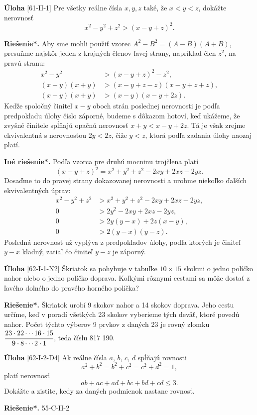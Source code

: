 \documentclass{article}
\newcommand{\rieh}{\textbf{Riešenie*.} }
\newcommand{\problem}[3]{
  \begin{tcolorbox}[breakable,notitle,boxrule=0pt,colback=light-gray,colframe=light-gray]
    \textbf{Úloha}
    [#1] #2
  \end{tcolorbox}
  \noindent#3
}
\begin{document}
\problem{61-II-1}{
Pre všetky reálne čísla $x, y, z$ také, že $x < y < z$, dokážte nerovnosť $$x^2 - y^2 + z^2> (x - y + z)^2.$$
}{
\rieh Aby sme mohli použiť vzorec $A^2 - B^2 = (A - B)(A + B)$, presuňme najskôr jeden z krajných členov ľavej strany, napríklad člen $z^2$, na pravú stranu:
\begin{align*}
x^2 - y^2 & > (x - y + z)^2-z^2,\\
(x - y)(x + y) & > (x - y + z - z)(x - y + z + z),\\
(x - y)(x + y) & > (x - y)(x - y + 2z).
\end{align*}
Keďže spoločný činiteľ $x - y$ oboch strán poslednej nerovnosti je podľa predpokladu úlohy číslo záporné, budeme s dôkazom hotoví, keď ukážeme, že zvyšné činitele spĺňajú opačnú nerovnosť $x + y < x - y + 2z$. Tá je však zrejme ekvivalentná s nerovnosťou $2y < 2z$, čiže $y < z$, ktorá podľa zadania úlohy naozaj platí.

\textbf{Iné riešenie*.} Podľa vzorca pre druhú mocninu trojčlena platí $$(x - y + z)^2= x^2+ y^2+ z^2 - 2xy + 2xz - 2yz.$$
Dosaďme to do pravej strany dokazovanej nerovnosti a urobme niekoľko ďalších ekvivalentných úprav:
\begin{align*}
x^2 - y^2+ z^2 &> x^2+ y^2+ z^2 - 2xy + 2xz - 2yz,\\
0 &> 2y^2 - 2xy + 2xz - 2yz,\\
0 &>  2y(y - x) + 2z(x - y),\\
0 &> 2(y - x)(y - z).
\end{align*}
Posledná nerovnosť už vyplýva z predpokladov úlohy, podľa ktorých je činiteľ $y - x$ kladný, zatiaľ čo činiteľ $y - z$ je záporný.
}


\problem{62-I-1-N2}{
Škriatok sa pohybuje v tabuľke $10 \times 15$ skokmi o jedno políčko nahor alebo o jedno políčko doprava. Koľkými rôznymi cestami sa môže dostať z ľavého dolného do pravého horného políčka? 
}{
\rieh Škriatok urobí 9 skokov nahor a 14 skokov doprava. Jeho cestu určíme, keď v poradí všetkých 23 skokov vyberieme tých deväť, ktoré povedú nahor. Počet týchto výberov 9 prvkov z daných 23 je rovný zlomku $\cfrac{23\cdot 22 \cdots 16\cdot 15}{9 \cdot 8 \cdots 2 \cdot 1}$, teda číslu 817 190.
}


\problem{62-I-2-D4}{
Ak reálne čísla $a$, $b$, $c$, $d$ spĺňajú rovnosti
$$a^2+ b^2= b^2+ c^2= c^2+ d^2= 1,$$
platí nerovnosť 
$$ab + ac + ad + bc + bd + cd \leq 3.$$
Dokážte a zistite, kedy za daných podmienok nastane rovnosť.
}{
\rieh 55-C-II-2
}
\end{document}
